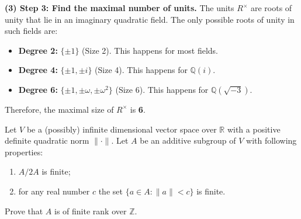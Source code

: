 \begin{solution}
\textbf{(3) Step 3: Find the maximal number of units.}
The units $R^\times$ are roots of unity that lie in an imaginary quadratic field.
The only possible roots of unity in such fields are:
\begin{itemize}
    \item \textbf{Degree 2:} $\{\pm 1\}$ (Size 2). This happens for most fields.
    \item \textbf{Degree 4:} $\{\pm 1, \pm i\}$ (Size 4). This happens for $\mathbb{Q}(i)$.
    \item \textbf{Degree 6:} $\{\pm 1, \pm \omega, \pm \omega^2\}$ (Size 6). This happens for $\mathbb{Q}(\sqrt{-3})$.
\end{itemize}
Therefore, the maximal size of $R^\times$ is \textbf{6}.
\end{solution}

\begin{exercise}
\label{algebra:2012:6}
Let $V$ be a (possibly) infinite dimensional vector space over $\mathbb{R}$ with a positive definite quadratic norm $\|\cdot\|$. Let $A$ be an additive subgroup of $V$ with following properties:
\begin{enumerate}
    \item $A/2A$ is finite;
    \item for any real number $c$ the set $\{ a \in A : \|a\| < c \}$ is finite.
\end{enumerate}
Prove that $A$ is of finite rank over $\mathbb{Z}$.
\end{exercise}

